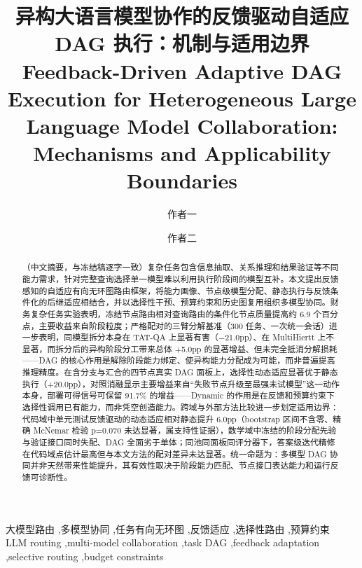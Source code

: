 \documentclass[review,12pt]{elsarticle}
\begin{document}
\begin{frontmatter}

\title{异构大语言模型协作的反馈驱动自适应 DAG 执行：机制与适用边界
\\[6pt]
\large Feedback-Driven Adaptive DAG Execution for Heterogeneous Large Language Model
Collaboration: Mechanisms and Applicability Boundaries}

\author[inst1]{作者一}
\author[inst1]{作者二}
\address[inst1]{单位，城市，国家}

\begin{abstract}
（中文摘要，与冻结稿逐字一致）复杂任务包含信息抽取、关系推理和结果验证等不同能力需求，针对完整查询选择单一模型难以利用执行阶段间的模型互补。本文提出反馈感知的自适应有向无环图路由框架，将能力画像、节点级模型分配、静态执行与反馈条件化的后继适应相结合，并以选择性干预、预算约束和历史图复用组织多模型协同。财务复杂任务实验表明，冻结节点路由相对查询路由的条件化节点质量提高约 6.9 个百分点，主要收益来自阶段粒度；严格配对的三臂分解基准（300 任务、一次统一会话）进一步表明，同模型拆分本身在 TAT-QA 上显著有害（−21.0pp）、在 MultiHiertt 上不显著，而拆分后的异构阶段分工带来总体 +5.0pp 的显著增益、但未完全抵消分解损耗——DAG 的核心作用是解除阶段能力绑定、使异构能力分配成为可能，而非普遍提高推理精度。在含分支与汇合的四节点真实 DAG 面板上，选择性动态适应显著优于静态执行（+20.0pp），对照消融显示主要增益来自``失败节点升级至最强未试模型''这一动作本身，部署可得信号可保留 91.7\% 的增益——Dynamic 的作用是在反馈和预算约束下选择性调用已有能力，而非凭空创造能力。跨域与外部方法比较进一步划定适用边界：代码域中单元测试反馈驱动的动态适应相对静态提升 6.0pp（bootstrap 区间不含零、精确 McNemar 检验 p=0.070 未达显著，属支持性证据），数学域中冻结的阶段分配先验与验证接口同时失配、DAG 全面劣于单体；同池同面板同评分器下，答案级迭代精修在代码域点估计最高但与本文方法的配对差异未达显著。统一命题为：多模型 DAG 协同并非天然带来性能提升，其有效性取决于阶段能力匹配、节点接口表达能力和运行反馈可诊断性。
\end{abstract}

\begin{keyword}
大模型路由 \sep 多模型协同 \sep 任务有向无环图 \sep 反馈适应 \sep 选择性路由 \sep 预算约束
\\ LLM routing \sep multi-model collaboration \sep task DAG \sep feedback adaptation \sep selective routing \sep budget constraints
\end{keyword}

\end{frontmatter}
\end{document}
